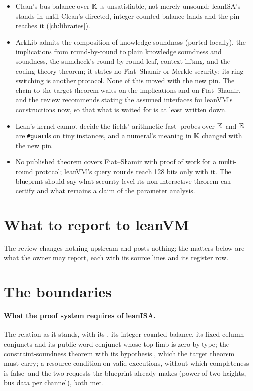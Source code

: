 \begin{itemize}
\item Clean's bus balance over $\mathbb{K}$ is unsatisfiable, not merely unsound: leanISA's
   stands in until Clean's directed, integer-counted balance lands and the
  pin reaches it (\cref{ch:libraries}).
\item ArkLib admits the composition of knowledge soundness (ported locally), the implications
  from round-by-round to plain knowledge soundness and soundness, the sumcheck's round-by-round
  leaf, context lifting, and the coding-theory theorem; it states no Fiat--Shamir or Merkle
  security; its ring switching is another protocol. None of this moved with the new pin. The
  chain to the target theorem waits on the implications and on Fiat--Shamir, and the review
  recommends stating the assumed interfaces for leanVM's constructions now, so that what is
  waited for is at least written down.
\item Lean's kernel cannot decide the fields' arithmetic fast: probes over $\mathbb{K}$ and $\mathbb{E}$ are
  \texttt{\#guard}s on tiny instances, and a numeral's meaning in $\mathbb{K}$ changed with the new pin.
\item No published theorem covers Fiat--Shamir with proof of work for a multi-round protocol;
  leanVM's query rounds reach 128 bits only with it. The blueprint should say what security
  level its non-interactive theorem can certify and what remains a claim of the parameter
  analysis.
\end{itemize}

\section{What to report to leanVM}\label{sec:opt-upstream-report}

The review changes nothing upstream and posts nothing; the matters below are what the owner
may report, each with its source lines and its register row.

\section{The boundaries}\label{sec:opt-boundaries}

\paragraph{What the proof system requires of leanISA.} The relation  as it
stands, with its , its integer-counted balance, its fixed-column conjuncts and its
public-word conjunct whose top limb is zero by type; the constraint-soundness theorem with its
hypothesis , which the target theorem must carry; a resource condition
on valid executions, without which completeness is false; and the two requests the blueprint
already makes (power-of-two heights, bus data per channel), both met.

